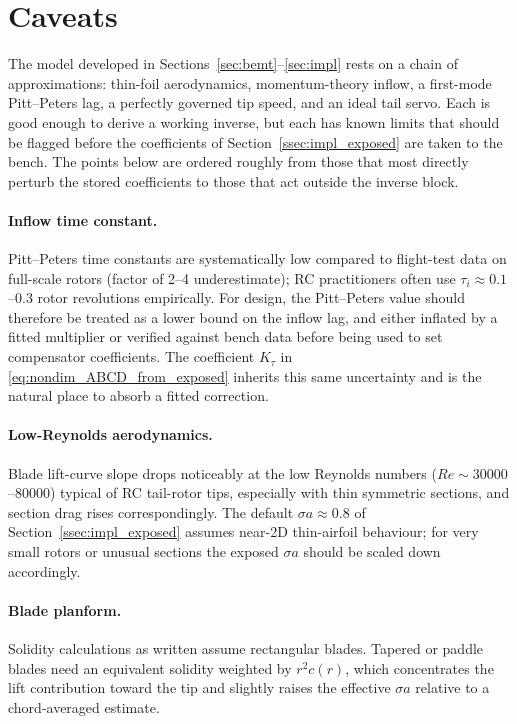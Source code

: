 \documentclass[11pt,a4paper]{article}
\let\oldsection\section
\renewcommand{\section}{\clearpage\oldsection}
\begin{document}
\section{Caveats}\label{sec:caveats}

The model developed in Sections~\ref{sec:bemt}--\ref{sec:impl} rests on
a chain of approximations: thin-foil aerodynamics, momentum-theory
inflow, a first-mode Pitt--Peters lag, a perfectly governed tip speed,
and an ideal tail servo. Each is good enough to derive a working
inverse, but each has known limits that should be flagged before the
coefficients of Section~\ref{ssec:impl_exposed} are taken to the
bench. The points below are ordered roughly from those that most
directly perturb the stored coefficients to those that act outside the
inverse block.

\paragraph{Inflow time constant.}
Pitt--Peters time constants are systematically low compared to
flight-test data on full-scale rotors (factor of 2--4 underestimate);
RC practitioners often use \(\tau_i\approx 0.1\)--\(0.3\) rotor
revolutions empirically. For design, the Pitt--Peters value should
therefore be treated as a lower bound on the inflow lag, and either
inflated by a fitted multiplier or verified against bench data before
being used to set compensator coefficients. The coefficient \(K_\tau\) in
\eqref{eq:nondim_ABCD_from_exposed} inherits this same uncertainty and
is the natural place to absorb a fitted correction.

\paragraph{Low-Reynolds aerodynamics.}
Blade lift-curve slope drops noticeably at the low Reynolds numbers
(\(Re\sim\num{30000}\)--\num{80000}) typical of RC tail-rotor tips,
especially with thin symmetric sections, and section drag rises
correspondingly. The default \(\sigma a\approx 0.8\) of
Section~\ref{ssec:impl_exposed} assumes near-2D thin-airfoil
behaviour; for very small rotors or unusual sections the exposed
\(\sigma a\) should be scaled down accordingly.

\paragraph{Blade planform.}
Solidity calculations as written assume rectangular blades. Tapered or
paddle blades need an equivalent solidity weighted by \(r^2 c(r)\),
which concentrates the lift contribution toward the tip and slightly
raises the effective \(\sigma a\) relative to a chord-averaged
estimate.
\end{document}
